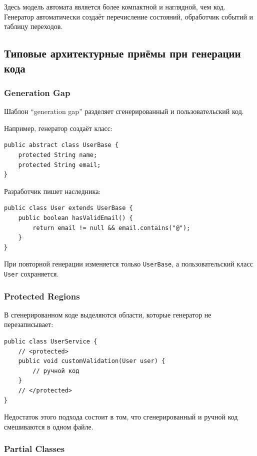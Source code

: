 \documentclass[12pt,a4paper]{article}
\begin{document}
Здесь модель автомата является более компактной и наглядной, чем код. Генератор автоматически создаёт перечисление состояний, обработчик событий и таблицу переходов.

\subsection{Типовые архитектурные приёмы при генерации кода}

\subsubsection{Generation Gap}

Шаблон ``generation gap'' разделяет сгенерированный и пользовательский код.

Например, генератор создаёт класс:

\begin{verbatim}
public abstract class UserBase {
    protected String name;
    protected String email;
}
\end{verbatim}

Разработчик пишет наследника:

\begin{verbatim}
public class User extends UserBase {
    public boolean hasValidEmail() {
        return email != null && email.contains("@");
    }
}
\end{verbatim}

При повторной генерации изменяется только \texttt{UserBase}, а пользовательский класс \texttt{User} сохраняется.

\subsubsection{Protected Regions}

В сгенерированном коде выделяются области, которые генератор не перезаписывает:

\begin{verbatim}
public class UserService {
    // <protected>
    public void customValidation(User user) {
        // ручной код
    }
    // </protected>
}
\end{verbatim}

Недостаток этого подхода состоит в том, что сгенерированный и ручной код смешиваются в одном файле.

\subsubsection{Partial Classes}
\end{document}
